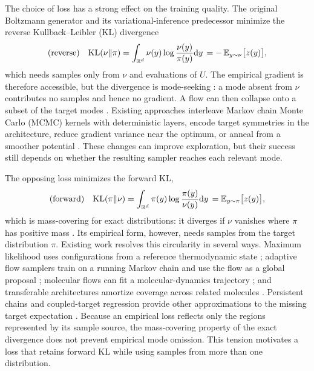\documentclass{article}
\begin{document}
The choice of loss has a strong effect on the training quality. The original Boltzmann generator \citep{noe2019boltzmann} and its variational-inference predecessor \citep{rezende2015variational} minimize the reverse Kullback--Leibler (KL) divergence
\begin{equation}
    \text{(reverse)}\quad \mathrm{KL}(\nu\|\pi) = \int_{\mathbb R^d} \nu(y) \log \frac{\nu(y)}{\pi(y)} \mathrm{d} y \,= -\,\mathbb E_{y\sim\nu}\bigl[z(y)\bigr],
    \label{eq: reverse KL}
\end{equation}
which needs samples only from $\nu$ and evaluations of $U$. The empirical gradient is therefore accessible, but the divergence is mode-seeking \citep{wainwright2008graphical}: a mode absent from $\nu$ contributes no samples and hence no gradient. A flow can then collapse onto a subset of the target modes \citep{wu2020stochastic,felardos2023designing}. Existing approaches interleave Markov chain Monte Carlo (MCMC) kernels with deterministic layers, encode target symmetries in the architecture, reduce gradient variance near the optimum, or anneal from a smoother potential \citep{wu2020stochastic,kohler2020equivariant,vaitl2022gradients,schopmans2025temperature}. These changes can improve exploration, but their success still depends on whether the resulting sampler reaches each relevant mode.

The opposing loss minimizes the forward KL,
\begin{equation}
    \text{(forward)}\quad \mathrm{KL}(\pi\|\nu) = \int_{\mathbb R^d} \pi(y) \log \frac{\pi(y)}{\nu(y)} \mathrm{d} y \,= \mathbb E_{y\sim\pi}\bigl[z(y)\bigr],
    \label{eq: forward KL}
\end{equation}
which is mass-covering for exact distributions: it diverges if $\nu$ vanishes where $\pi$ has positive mass \citep{wainwright2008graphical}. Its empirical form, however, needs samples from the target distribution $\pi$. Existing work resolves this circularity in several ways. Maximum likelihood uses configurations from a reference thermodynamic state \citep{wirnsberger2020targeted}; adaptive flow samplers train on a running Markov chain and use the flow as a global proposal \citep{gabrie2022adaptive}; molecular flows can fit a molecular-dynamics trajectory \citep{klein2023equivariant}; and transferable architectures amortize coverage across related molecules \citep{klein2024transferable}. Persistent chains and coupled-target regression provide other approximations to the missing target expectation \citep{naesseth2020markovian,rehman2026regflow}. Because an empirical loss reflects only the regions represented by its sample source, the mass-covering property of the exact divergence does not prevent empirical mode omission. This tension motivates a loss that retains forward KL while using samples from more than one distribution.
\end{document}
